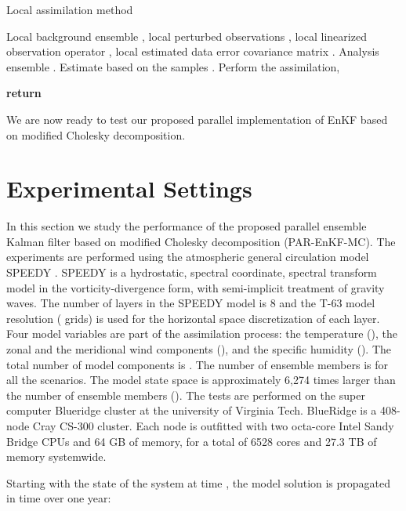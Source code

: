 \documentclass[12pt]{article}
\begin{document}
\begin{algorithm}
\caption{Local assimilation method}\label{alg:perform-local-assimilation}
\begin{algorithmic}[1]
\Require Local background ensemble , local perturbed observations , local linearized observation operator , local estimated data error covariance matrix .
\Ensure Analysis ensemble .
\State Estimate  based on the samples .
\State Perform the assimilation,

\State \textbf{return} 
\EndProcedure \end{algorithmic}
\end{algorithm}


We are now ready to test our proposed parallel implementation of EnKF based on modified Cholesky decomposition.

\section{Experimental Settings}
\label{sec:experiments}

In this section we study the performance of the proposed parallel ensemble Kalman filter based on modified Cholesky decomposition (PAR-EnKF-MC). The experiments are performed using the atmospheric general circulation model SPEEDY \cite{Speedy1,Speedy2}. SPEEDY is a hydrostatic, spectral coordinate, spectral transform model in the vorticity-divergence form, with semi-implicit treatment of gravity waves. The number of layers in the SPEEDY model is 8 and the T-63 model resolution ( grids)  is used for the horizontal space discretization of each layer. Four model variables are part of the assimilation process: the temperature (), the zonal and the meridional wind components (), and the specific humidity (). The total number of model components is . The number of ensemble members is  for all the scenarios. The model state space is approximately 6,274 times larger than the number of ensemble members (). The tests are performed on the super computer Blueridge cluster at the university of  Virginia Tech. BlueRidge is a 408-node Cray CS-300 cluster. Each node is outfitted with two octa-core Intel Sandy Bridge CPUs and 64 GB of memory, for a total of 6528 cores and 27.3 TB of memory systemwide.

Starting with the state of the system   at time , the model solution  is propagated in time over one year:
\end{document}

